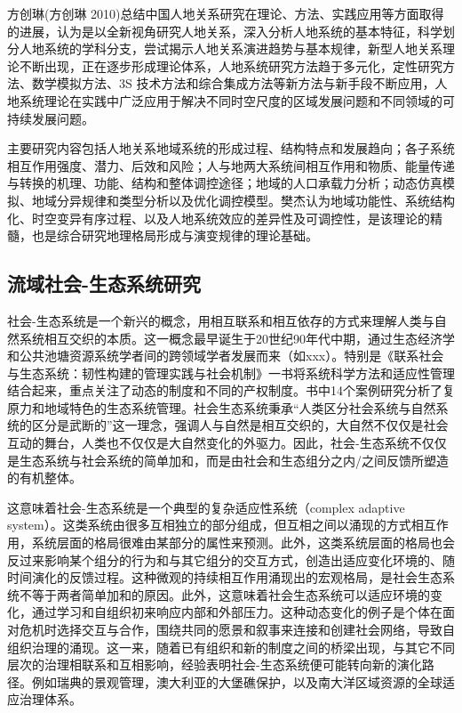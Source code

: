 
方创琳(方创琳 2010)总结中国人地关系研究在理论、方法、实践应用等方面取得的进展，认为是以全新视角研究人地关系，深入分析人地系统的基本特征，科学划分人地系统的学科分支，尝试揭示人地关系演进趋势与基本规律，新型人地关系理论不断出现，正在逐步形成理论体系，人地系统研究方法趋于多元化，定性研究方法、数学模拟方法、3S 技术方法和综合集成方法等新方法与新手段不断应用，人地系统理论在实践中广泛应用于解决不同时空尺度的区域发展问题和不同领域的可持续发展问题。

主要研究内容包括人地关系地域系统的形成过程、结构特点和发展趋向；各子系统相互作用强度、潜力、后效和风险；人与地两大系统间相互作用和物质、能量传递与转换的机理、功能、结构和整体调控途径；地域的人口承载力分析；动态仿真模拟、地域分异规律和类型分析以及优化调控模型。樊杰认为地域功能性、系统结构化、时空变异有序过程、以及人地系统效应的差异性及可调控性，是该理论的精髓，也是综合研究地理格局形成与演变规律的理论基础。


\subsection{流域社会-生态系统研究}

社会-生态系统是一个新兴的概念，用相互联系和相互依存的方式来理解人类与自然系统相互交织的本质。这一概念最早诞生于20世纪90年代中期，通过生态经济学和公共池塘资源系统学者间的跨领域学者发展而来（如xxx）。特别是《联系社会与生态系统：韧性构建的管理实践与社会机制》一书将系统科学方法和适应性管理结合起来，重点关注了动态的制度和不同的产权制度。书中14个案例研究分析了复原力和地域特色的生态系统管理。社会生态系统秉承“人类区分社会系统与自然系统的区分是武断的”这一理念，强调人与自然是相互交织的，大自然不仅仅是社会互动的舞台，人类也不仅仅是大自然变化的外驱力。因此，社会-生态系统不仅仅是生态系统与社会系统的简单加和，而是由社会和生态组分之内/之间反馈所塑造的有机整体。

这意味着社会-生态系统是一个典型的复杂适应性系统（complex adaptive system）。这类系统由很多互相独立的部分组成，但互相之间以涌现的方式相互作用，系统层面的格局很难由某部分的属性来预测。此外，这类系统层面的格局也会反过来影响某个组分的行为和与其它组分的交互方式，创造出适应变化环境的、随时间演化的反馈过程。这种微观的持续相互作用涌现出的宏观格局，是社会生态系统不等于两者简单加和的原因。此外，这意味着社会生态系统可以适应环境的变化，通过学习和自组织初来响应内部和外部压力。这种动态变化的例子是个体在面对危机时选择交互与合作，围绕共同的愿景和叙事来连接和创建社会网络，导致自组织治理的涌现。这一来，随着已有组织和新的制度之间的桥梁出现，与其它不同层次的治理相联系和互相影响，经验表明社会-生态系统便可能转向新的演化路径。例如瑞典的景观管理，澳大利亚的大堡礁保护，以及南大洋区域资源的全球适应治理体系。

